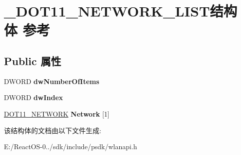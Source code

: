 \hypertarget{struct___d_o_t11___n_e_t_w_o_r_k___l_i_s_t}{}\section{\+\_\+\+D\+O\+T11\+\_\+\+N\+E\+T\+W\+O\+R\+K\+\_\+\+L\+I\+S\+T结构体 参考}
\label{struct___d_o_t11___n_e_t_w_o_r_k___l_i_s_t}
\subsection*{Public 属性}
\begin{DoxyCompactItemize}
\item 
\mbox{\label{struct___d_o_t11___n_e_t_w_o_r_k___l_i_s_t_ad5b2c76c89e55903c46a8d20e25663f2}} 
D\+W\+O\+RD {\bfseries dw\+Number\+Of\+Items}
\item 
\mbox{\label{struct___d_o_t11___n_e_t_w_o_r_k___l_i_s_t_aa45a3aa5cc725dd3585ea9c4aa69d6f1}} 
D\+W\+O\+RD {\bfseries dw\+Index}
\item 
\mbox{\label{struct___d_o_t11___n_e_t_w_o_r_k___l_i_s_t_ae1e370061061ea441ddba7e03bb468da}} 
\hyperlink{struct___d_o_t11___n_e_t_w_o_r_k}{D\+O\+T11\+\_\+\+N\+E\+T\+W\+O\+RK} {\bfseries Network} \mbox{[}1\mbox{]}
\end{DoxyCompactItemize}


该结构体的文档由以下文件生成\+:\begin{DoxyCompactItemize}
\item 
E\+:/\+React\+O\+S-\/0../sdk/include/psdk/wlanapi.\+h\end{DoxyCompactItemize}
